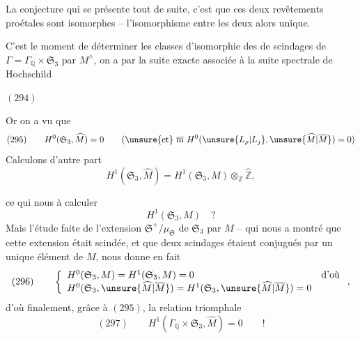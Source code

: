 La conjecture qui se présente tout de suite, c'est que ces deux revêtements proétales sont isomorphes -- l'isomorphisme entre les deux  alors unique.


 C'est le moment de déterminer les classes d'isomorphie des  de scindages de  $\Gamma=\Gamma_{\mathbb Q}\times\mathfrak S_3$ par $M^{\wedge}$, on a par la suite exacte associée à la suite spectrale de Hochschild

$(294)$\quad
{}

Or on a vu que
\[
(295)\qquad H^0(\mathfrak S_3,\widehat M)=0
\qquad(\text{\unsure{et} }\overline{\mathrm m}\ H^0(\unsure{L_\rho|L_j},\unsure{\widehat M|\overline M})=0)
\]
 Calculons d'autre part
\[
H^1(\mathfrak S_3,\widehat M)=H^1(\mathfrak S_3,M)\otimes_{\mathbb Z}\widehat{\mathbb Z},
\]




ce qui nous  à calculer
\[
H^1(\mathfrak S_3,M)\quad ?
\]
Mais l'étude faite de l'extension $\mathfrak S^+/\mu_{\mathfrak S}$ de $\mathfrak S_3$ par $M$ -- qui nous a montré que cette extension était scindée, et que deux scindages étaient conjugués par un unique élément de $M$, nous donne en fait
\[
(296)\qquad
\left\{\begin{array}{ll}
H^0(\mathfrak S_3,M)=H^1(\mathfrak S_3,M)=0&\text{d'où}\\
H^0(\mathfrak S_3,\unsure{\widehat M|\overline M})=H^1(\mathfrak S_3,\unsure{\widehat M|\overline M})=0&
\end{array}\right.
,
\]
d'où finalement, grâce à $(295)$, la relation triomphale
\[
(297)\qquad\boxed{H^1(\Gamma_{\mathbb Q}\times\mathfrak S_3,\widehat M)=0}\qquad !
\]


